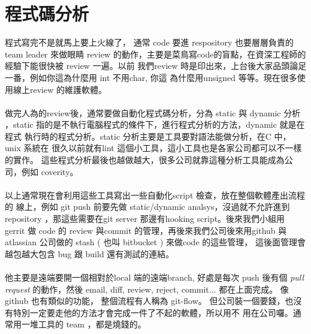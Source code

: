 \chapter{程式碼分析}
程式寫完不是就馬上要上火線了，
通常 code 要進 respository 也要層層負責的 team leader 來做眼睛 review
的動作，主要是菜鳥寫code的盲點，在資深工程師的經驗下能很快被 review 一遍。以前
我們review 時是印出來，上台後大家品頭論足一番，例如你這為什麼用 int 不用char, 你這
為什麼用unsigned 等等。現在很多使用線上review 的維護軟體。
\\\\
做完人為的review後，通常要做自動化程式碼分析，分為 static 與 dynamic 分析
，static 指的是不執行電腦程式的條件下，進行程式分析的方法，dynamic 就是在程式
執行時的程式分析。static 分析主要是工具要對語法能做分析，在C 中，unix 系統在
很久以前就有lint 這個小工具，這小工具也是各家公司都可以不一樣的實作。
這些程式分析最後也越做越大，很多公司就靠這種分析工具能成為公司，例如 coverity。
\\\\
以上通常現在會利用這些工具寫出一些自動化script 檢查，放在整個軟體產出流程的
線上，例如 git push 前要先做 static/dynamic analsys，沒過就不允許進到 repository
，那這些需要在git server 那邊有hooking script。後來我們小組用 gerrit 做 code 的
review 與commit 的管理，再後來我們公司後來用github 與 atlassian 公司做的 stash
( 也叫 bitbucket ) 來做code 的這些管理， 這後面管理會越包越大包含 bug 跟 build
還有測試的連結。
\\\\
他主要是遠端要開一個相對於local 端的遠端branch, 好處是每次 push 後有個 
\emph{pull request} 的動作，然後 email, diff, review, reject, commit...
都在上面完成。 像 github 也有類似的功能， 整個流程有人稱為 git-flow。
但公司裝一個要錢，也沒有特別一定要走他的方法才會完成一件了不起的軟體，所以用不
用在公司囉。通常用一堆工具的 team ，都是燒錢的。

